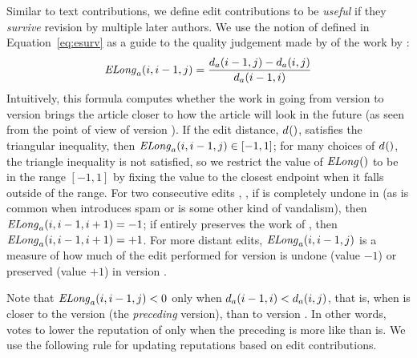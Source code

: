 Similar to text contributions, we define edit contributions to
be \textit{useful} if they \textit{survive} revision by multiple
later authors.
We use the notion of  defined in
Equation~\ref{eq:esurv} as a guide to the quality judgement
made by  of the work by :
\begin{equation*}
\mathit{ELong}_{a}(i,i-1,j) = \frac{d_{a}(i-1,j) - d_{a}(i,j)}
                        {d_{a}(i-1,i)}
\end{equation*}
Intuitively, this formula computes whether the work in going
from version  to version  brings the
article closer to how the article will look in the future
(as seen from the point of view of version ).
If the edit distance, $d_{}()$,
satisfies the triangular inequality,
then $\mathit{ELong}_{a}(i,i-1,j) \in [-1,1]$; for many choices of $d_{}()$,
the triangle inequality is not satisfied, so
we restrict the value of $\mathit{ELong}_{}()$ to be in the range $[-1,1]$
by fixing the value to the closest endpoint when
it falls outside of the range.
For two consecutive edits , ,
if  is completely undone in 
(as is common when  introduces spam or is some other
kind of vandalism), then $\mathit{ELong}_{a}(i,i-1,i+1) = -1$;
if  entirely preserves the work of ,
then $\mathit{ELong}_{a}(i,i-1,i+1) = +1$.
For more distant edits, $\mathit{ELong}_{a}(i,i-1,j)$ is a measure of how much of the
edit performed for version 
is undone (value $-1$) or preserved (value $+1$) in version .

Note that $\mathit{ELong}_{a}(i,i-1,j) < 0$
only when
$d_{a}(i-1,i) < d_{a}(i,j)$,
that is,
when  is closer to the version 
(the \textit{preceding} version), than to version .
In other words, 
votes to lower the reputation of 
only when the preceding  is more like 
than  is.
We use the following rule for updating reputations based on
edit contributions.

